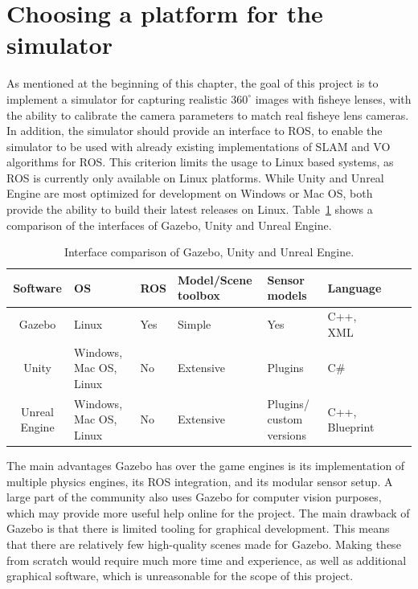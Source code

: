 \section{Choosing a platform for the simulator} \label{sec:Chooseplatform}

As mentioned at the beginning of this chapter, the goal of this project is to implement a simulator for capturing realistic $360^\circ$ images with fisheye lenses, with the ability to calibrate the camera parameters to match real fisheye lens cameras. In addition, the simulator should provide an interface to ROS, to enable the simulator to be used with already existing implementations of SLAM and VO algorithms for ROS. This criterion limits the usage to Linux based systems, as ROS is currently only available on Linux platforms. While Unity and Unreal Engine are most optimized for development on Windows or Mac OS, both provide the ability to build their latest releases on Linux. Table~\ref{tab:comparison_interface} shows a comparison of the interfaces of Gazebo, Unity and Unreal Engine.

\begin{table}[!htb]
    \centering
    \caption{Interface comparison of Gazebo, Unity and Unreal Engine.}
    \label{tab:comparison_interface}
    \begin{tabular}{|c|>{\centering\arraybackslash}m{2cm}|>{\centering\arraybackslash}m{2cm}|>{\centering\arraybackslash}m{2.8cm}|>{\centering\arraybackslash}m{2cm}|>{\centering\arraybackslash}m{2cm}|>{\centering\arraybackslash}m{2cm}|>{\centering\arraybackslash}m{2cm}|} \hline
        \textbf{Software}          & \textbf{OS}  & \textbf{ROS} & \textbf{Model/Scene toolbox}   & \textbf{Sensor models} & \textbf{Language}              \\ \hline \hline
        Gazebo          & Linux           & Yes           & Simple  & Yes & C++, XML                 \\ \hline
        Unity           & Windows, Mac OS, Linux                    & No            & Extensive & Plugins & C\# \\ \hline
        Unreal Engine   & Windows, Mac OS, Linux  & No            & Extensive & Plugins/ custom versions & C++, Blueprint \\ \hline
    \end{tabular}
\end{table}

The main advantages Gazebo has over the game engines is its implementation of multiple physics engines, its ROS integration, and its modular sensor setup. A large part of the community also uses Gazebo for computer vision purposes, which may provide more useful help online for the project. The main drawback of Gazebo is that there is limited tooling for graphical development. This means that there are relatively few high-quality scenes made for Gazebo. Making these from scratch would require much more time and experience, as well as additional graphical software, which is unreasonable for the scope of this project. 

